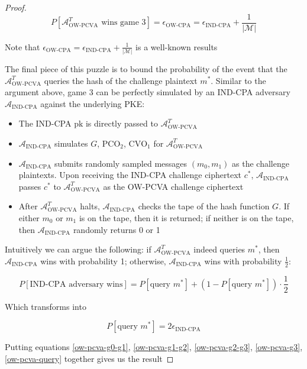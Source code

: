 \documentclass{article}
\begin{document}
\begin{proof}
    \begin{equation}\label{ow-pcva-g3}
        P[\text{$\mathcal{A}^T_\text{OW-PCVA}$ wins game 3}] 
        = \epsilon_\text{OW-CPA} 
        = \epsilon_\text{IND-CPA} + \frac{1}{\vert\mathcal{M}\vert}
    \end{equation}

    Note that $\epsilon_\text{OW-CPA} = \epsilon_\text{IND-CPA} + \frac{1}{\vert\mathcal{M}\vert}$ is a well-known results

    The final piece of this puzzle is to bound the probability of the event that the $\mathcal{A}^T_\text{OW-PCVA}$ queries the hash of the challenge plaintext $m^\ast$. Similar to the argument above, game 3 can be perfectly simulated by an IND-CPA adversary $\mathcal{A}_\text{IND-CPA}$ against the underlying PKE:

    \begin{itemize}
        \item The IND-CPA $\text{pk}$ is directly passed to $\mathcal{A}^T_\text{OW-PCVA}$
        \item $\mathcal{A}_\text{IND-CPA}$ simulates $G$, $\text{PCO}_2$, $\text{CVO}_1$ for $\mathcal{A}^T_\text{OW-PCVA}$
        \item $\mathcal{A}_\text{IND-CPA}$ submits randomly sampled messages $(m_0, m_1)$ as the challenge plaintexts. Upon receiving the IND-CPA challenge ciphertext $c^\ast$, $\mathcal{A}_\text{IND-CPA}$ passes $c^\ast$ to $\mathcal{A}^T_\text{OW-PCVA}$ as the OW-PCVA challenge ciphertext
        \item After $\mathcal{A}^T_\text{OW-PCVA}$ halts, $\mathcal{A}_\text{IND-CPA}$ checks the tape of the hash function $G$. If either $m_0$ or $m_1$ is on the tape, then it is returned; if neither is on the tape, then $\mathcal{A}_\text{IND-CPA}$ randomly returns 0 or 1
    \end{itemize}

    Intuitively we can argue the following: if $\mathcal{A}^T_\text{OW-PCVA}$ indeed queries $m^\ast$, then $\mathcal{A}_\text{IND-CPA}$ wins with probability 1; otherwise, $\mathcal{A}_\text{IND-CPA}$ wins with probability $\frac{1}{2}$:

    $$
    P[\text{IND-CPA adversary wins}] 
        = P[\text{query $m^\ast$}] 
            + (1 - P[\text{query $m^\ast$}]) \cdot \frac{1}{2}
    $$

    Which transforms into

    \begin{equation}\label{ow-pcva-query}
        P[\text{query $m^\ast$}] = 2\epsilon_\text{IND-CPA}
    \end{equation}

    Putting equations \ref{ow-pcva-g0-g1}, \ref{ow-pcva-g1-g2}, \ref{ow-pcva-g2-g3}, \ref{ow-pcva-g3}, \ref{ow-pcva-query} together gives us the result

\end{proof}
\end{document}
